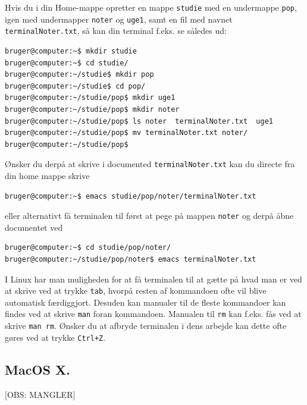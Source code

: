 \documentclass[a4paper]{article}
\begin{document}
Hvis du i din Home-mappe opretter en mappe \texttt{studie} med en undermappe \texttt{pop}, igen med undermapper \texttt{noter} og \texttt{uge1}, samt en fil med navnet \texttt{terminalNoter.txt}, så kan din terminal f.eks. se således ud:

\begin{lstlisting}[frame=single, language=bash]
bruger@computer:~$ mkdir studie
bruger@computer:~$ cd studie/
bruger@computer:~/studie$ mkdir pop
bruger@computer:~/studie$ cd pop/
bruger@computer:~/studie/pop$ mkdir uge1
bruger@computer:~/studie/pop$ mkdir noter
bruger@computer:~/studie/pop$ ls noter  terminalNoter.txt  uge1
bruger@computer:~/studie/pop$ mv terminalNoter.txt noter/
bruger@computer:~/studie/pop$
\end{lstlisting}
Ønsker du derpå at skrive i documented \texttt{terminalNoter.txt} kan du directe fra din home mappe skrive
\begin{verbatim}
bruger@computer:~$ emacs studie/pop/noter/terminalNoter.txt
\end{verbatim}
eller alternativt få terminalen til først at pege på mappen \texttt{noter} og derpå åbne documentet ved
\begin{verbatim}
bruger@computer:~$ cd studie/pop/noter/
bruger@computer:~/studie/pop/noter$ emacs terminalNoter.txt
\end{verbatim}

I Linux har man muligheden for at få terminalen til at gætte på hvad man er ved at skrive ved at trykke \texttt{tab}, hvorpå resten af kommandoen ofte vil blive automatisk færdiggjort. Desuden kan manualer til de fleste kommandoer kan findes ved at skrive \texttt{man} foran kommandoen. Manualen til \texttt{rm} kan f.eks. fås ved at skrive \texttt{man rm}. Ønsker du at afbryde terminalen i dens arbejde kan dette ofte gøres ved at trykke \texttt{Ctrl+Z}.

\subsection{MacOS X.}

[OBS: MANGLER]


\end{document}
